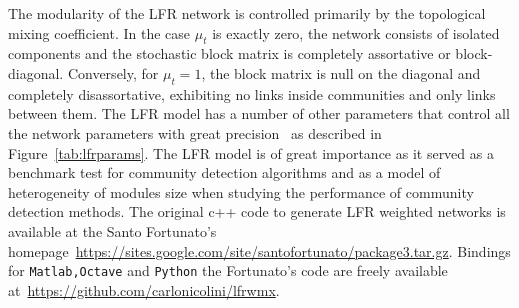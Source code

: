 The modularity of the LFR network is controlled primarily by the topological mixing coefficient.
In the case $\mu_t$ is exactly zero, the network consists of isolated components and the stochastic block matrix is completely assortative or block-diagonal.
Conversely, for $\mu_t=1$, the block matrix is null on the diagonal and completely disassortative, exhibiting no links inside communities and only links between them.
The LFR model has a number of other parameters that control all the network parameters with great precision~\cite{lancichinetti2008,lancichinetti2009a} as described in Figure~\ref{tab:lfrparams}.
The LFR model is of great importance as it served as a benchmark test for community detection algorithms and as a model of heterogeneity of modules size when studying the performance of community detection methods. The original c++ code to generate LFR weighted networks is available at the Santo Fortunato's homepage~\url{https://sites.google.com/site/santofortunato/package3.tar.gz}.
Bindings for \texttt{Matlab,Octave} and \texttt{Python} the Fortunato's code are freely available at~\url{https://github.com/carlonicolini/lfrwmx}.


